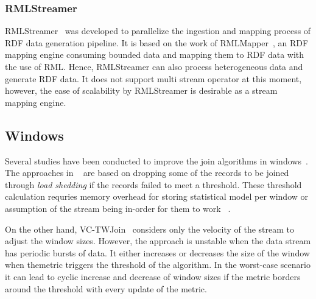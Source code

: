 \subsubsection{RMLStreamer}
RMLStreamer~\cite{rml_streamer}
was developed to parallelize the ingestion and mapping process of RDF data generation pipeline. 
It is based on the work of RMLMapper~\cite{rml}, an RDF mapping engine consuming bounded data and mapping them to RDF data with the use of RML. Hence, RMLStreamer can also 
process heterogeneous data and generate RDF data. It does not support 
multi stream operator at this moment, however, the ease of scalability by RMLStreamer
is desirable as a stream mapping engine. 


\subsection{Windows}
Several studies have been conducted to 
improve the join algorithms in windows~\cite{vctw_join, join_tracking, grubjoin, approximate_window_sem, approx_window}. 
The approaches in ~\cite{grubjoin, approximate_window_sem, approx_window} are based 
on dropping some of the records to be joined through \emph{load shedding} if the 
records failed to meet a threshold. These threshold calculation requries 
memory overhead for storing statistical model per window or 
assumption of the stream being in-order for them to work
~\cite{grubjoin, approximate_window_sem, approx_window}.

On the other hand, VC-TWJoin~\cite{vctw_join} considers only the velocity of the 
stream to adjust the window sizes. 
However, the approach is unstable when the data stream has periodic bursts of data.
It either increases or decreases the size of the window when themetric triggers 
the threshold of the algorithm. In the worst-case scenario it 
can lead to cyclic increase and 
decrease of window sizes if the metric borders around the threshold with every 
update of the metric.




